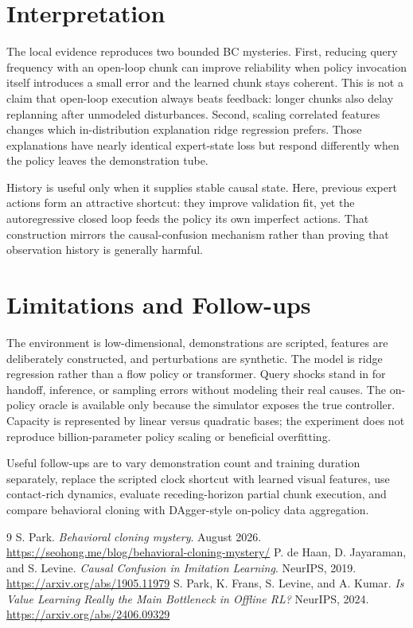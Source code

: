 \documentclass[11pt]{article}
\begin{document}
\section{Interpretation}

The local evidence reproduces two bounded BC mysteries. First, reducing query frequency with an open-loop chunk can improve reliability when policy invocation itself introduces a small error and the learned chunk stays coherent. This is not a claim that open-loop execution always beats feedback: longer chunks also delay replanning after unmodeled disturbances. Second, scaling correlated features changes which in-distribution explanation ridge regression prefers. Those explanations have nearly identical expert-state loss but respond differently when the policy leaves the demonstration tube.

History is useful only when it supplies stable causal state. Here, previous expert actions form an attractive shortcut: they improve validation fit, yet the autoregressive closed loop feeds the policy its own imperfect actions. That construction mirrors the causal-confusion mechanism rather than proving that observation history is generally harmful.

\section{Limitations and Follow-ups}

The environment is low-dimensional, demonstrations are scripted, features are deliberately constructed, and perturbations are synthetic. The model is ridge regression rather than a flow policy or transformer. Query shocks stand in for handoff, inference, or sampling errors without modeling their real causes. The on-policy oracle is available only because the simulator exposes the true controller. Capacity is represented by linear versus quadratic bases; the experiment does not reproduce billion-parameter policy scaling or beneficial overfitting.

Useful follow-ups are to vary demonstration count and training duration separately, replace the scripted clock shortcut with learned visual features, use contact-rich dynamics, evaluate receding-horizon partial chunk execution, and compare behavioral cloning with DAgger-style on-policy data aggregation.

\begin{thebibliography}{9}
 S. Park. \emph{Behavioral cloning mystery}. August 2026. \url{https://seohong.me/blog/behavioral-cloning-mystery/}
 P. de Haan, D. Jayaraman, and S. Levine. \emph{Causal Confusion in Imitation Learning}. NeurIPS, 2019. \url{https://arxiv.org/abs/1905.11979}
 S. Park, K. Frans, S. Levine, and A. Kumar. \emph{Is Value Learning Really the Main Bottleneck in Offline RL?} NeurIPS, 2024. \url{https://arxiv.org/abs/2406.09329}
\end{thebibliography}
\end{document}
